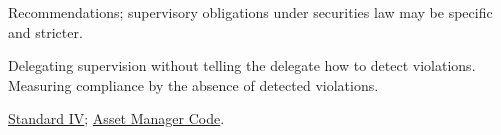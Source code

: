 \begin{qfmethod}
 Recommendations; supervisory obligations under securities law may be specific and stricter.

 Delegating supervision without telling the delegate how to detect violations. Measuring compliance by the absence of detected violations.

 \hyperref[rule:standard-duties-to-employers]{Standard IV}; \hyperref[meth:asset-manager-code-compliance]{Asset Manager Code}.

\end{qfmethod}
